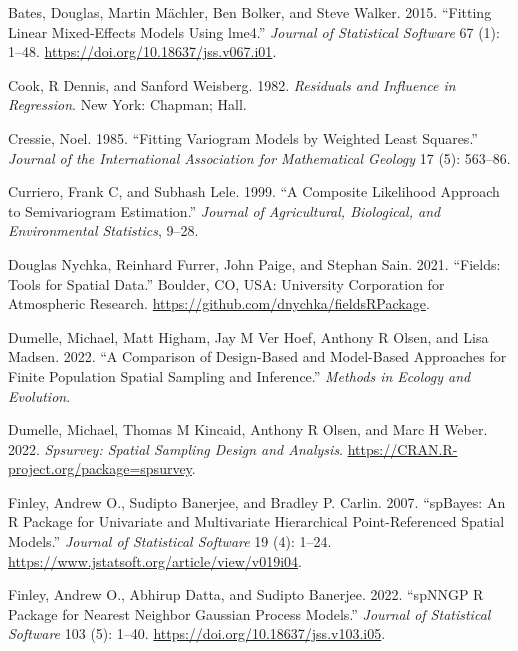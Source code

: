 \documentclass{article}
\newlength{\cslhangindent}
\newlength{\cslentryspacingunit} %
\newenvironment{CSLReferences}[2] %
 {%
  \setlength{\parindent}{0pt}
  \ifodd #1
  \let\oldpar\par
  \def\par{\hangindent=\cslhangindent\oldpar}
  \fi
  \setlength{\parskip}{#2\cslentryspacingunit}
 }%
 {}
\begin{document}
\hypertarget{refs}{}
\begin{CSLReferences}{1}{0}
\leavevmode\hypertarget{ref-bates2015lme4}{}%
Bates, Douglas, Martin Mächler, Ben Bolker, and Steve Walker. 2015.
{``Fitting Linear Mixed-Effects Models Using {lme4}.''} \emph{Journal of
Statistical Software} 67 (1): 1--48.
\url{https://doi.org/10.18637/jss.v067.i01}.

\leavevmode\hypertarget{ref-cook1982residuals}{}%
Cook, R Dennis, and Sanford Weisberg. 1982. \emph{Residuals and
Influence in Regression}. New York: Chapman; Hall.

\leavevmode\hypertarget{ref-cressie1985fitting}{}%
Cressie, Noel. 1985. {``Fitting Variogram Models by Weighted Least
Squares.''} \emph{Journal of the International Association for
Mathematical Geology} 17 (5): 563--86.

\leavevmode\hypertarget{ref-curriero1999composite}{}%
Curriero, Frank C, and Subhash Lele. 1999. {``A Composite Likelihood
Approach to Semivariogram Estimation.''} \emph{Journal of Agricultural,
Biological, and Environmental Statistics}, 9--28.

\leavevmode\hypertarget{ref-nychka2021fields}{}%
Douglas Nychka, Reinhard Furrer, John Paige, and Stephan Sain. 2021.
{``Fields: Tools for Spatial Data.''} Boulder, CO, USA: University
Corporation for Atmospheric Research.
\url{https://github.com/dnychka/fieldsRPackage}.

\leavevmode\hypertarget{ref-dumelle2022comparison}{}%
Dumelle, Michael, Matt Higham, Jay M Ver Hoef, Anthony R Olsen, and Lisa
Madsen. 2022. {``A Comparison of Design-Based and Model-Based Approaches
for Finite Population Spatial Sampling and Inference.''} \emph{Methods
in Ecology and Evolution}.

\leavevmode\hypertarget{ref-dumelle2022spsurvey}{}%
Dumelle, Michael, Thomas M Kincaid, Anthony R Olsen, and Marc H Weber.
2022. \emph{Spsurvey: Spatial Sampling Design and Analysis}.
\url{https://CRAN.R-project.org/package=spsurvey}.

\leavevmode\hypertarget{ref-finley2007spbayes}{}%
Finley, Andrew O., Sudipto Banerjee, and Bradley P. Carlin. 2007.
{``{spBayes}: An {R} Package for Univariate and Multivariate
Hierarchical Point-Referenced Spatial Models.''} \emph{Journal of
Statistical Software} 19 (4): 1--24.
\url{https://www.jstatsoft.org/article/view/v019i04}.

\leavevmode\hypertarget{ref-finley2002spnngp}{}%
Finley, Andrew O., Abhirup Datta, and Sudipto Banerjee. 2022.
{``{spNNGP} {R} Package for Nearest Neighbor {G}aussian Process
Models.''} \emph{Journal of Statistical Software} 103 (5): 1--40.
\url{https://doi.org/10.18637/jss.v103.i05}.


\end{CSLReferences}
\end{document}

